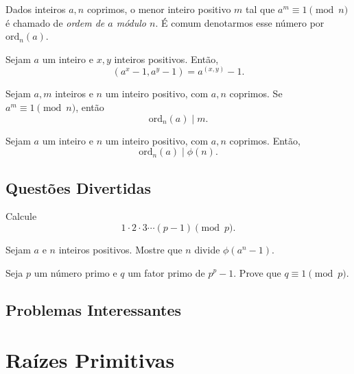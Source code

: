 \documentclass[10pt, a4paper]{report}
\begin{document}
	\begin{defn}[Ordem]
		Dados inteiros $a, n$ coprimos, o menor inteiro positivo $m$ tal que $a^m \equiv 1 \pmod{n}$ é chamado de \emph{ordem de $a$ módulo $n$}. É comum denotarmos esse número por $\mathrm{ord}_n(a)$.
	\end{defn}

	\begin{lem}
		Sejam $a$ um inteiro e $x, y$ inteiros positivos. Então, \[
			(a^x - 1, a^y - 1) = a^{(x, y)} - 1.
		\]
	\end{lem}

	\begin{thm}
		Sejam $a, m$ inteiros e $n$ um inteiro positivo, com $a, n$ coprimos. Se $a^m \equiv 1 \pmod{n}$, então \[
			\mathrm{ord}_n(a) \mid m.
		\]
	\end{thm}

	\begin{cor}
		Sejam $a$ um inteiro e $n$ um inteiro positivo, com $a, n$ coprimos. Então, \[
			\mathrm{ord}_n(a) \mid \phi(n).
		\]
	\end{cor}


	\newpage
	\section{Questões Divertidas}
	\begin{prob}
		Calcule \[
			1\cdot2\cdot3\cdots(p-1) \pmod{p}.
		\]
	\end{prob}

	\begin{prob}
		Sejam $a$ e $n$ inteiros positivos. Mostre que $n$ divide $\phi(a^n - 1)$.
	\end{prob}

	\begin{prob}
		Seja $p$ um número primo e $q$ um fator primo de $p^p - 1$. Prove que $q \equiv 1 \pmod{p}$.
	\end{prob}
	\section{Problemas Interessantes}

	\chapter{Raízes Primitivas}
\end{document}
